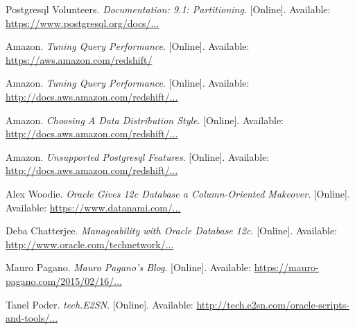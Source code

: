 \documentclass[draftclsnofoot, onecolumn, compsoc, 10pt]{IEEEtran}
\begin{document}
\begin{thebibliography}{9}
Postgresql Volunteers.
\textit{Documentation: 9.1: Partitioning}.
[Online].
Available: \href{https://www.postgresql.org/docs/9.1/static/ddl-partitioning.html}{https://www.postgresql.org/docs/...}

Amazon.
\textit{Tuning Query Performance}.
[Online].
Available: \href{https://aws.amazon.com/redshift/}{https://aws.amazon.com/redshift/}

Amazon.
\textit{Tuning Query Performance}.
[Online].
Available: \href{http://docs.aws.amazon.com/redshift/latest/dg/c-optimizing-query-performance.html}{http://docs.aws.amazon.com/redshift/...}

Amazon.
\textit{Choosing A Data Distribution Style}.
[Online].
Available: \href{http://docs.aws.amazon.com/redshift/latest/dg/t_Distributing_data.html}{http://docs.aws.amazon.com/redshift/...}

Amazon.
\textit{Unsupported Postgresql Features}.
[Online].
Available: \href{http://docs.aws.amazon.com/redshift/latest/dg/c_unsupported-postgresql-features.html}{http://docs.aws.amazon.com/redshift/...}

Alex Woodie.
\textit{Oracle Gives 12c Database a Column-Oriented Makeover}.
[Online].
Available: \href{https://www.datanami.com/2013/09/23/oracle_gives_12c_database_a_column-oriented_makeover/}{https://www.datanami.com/...}


Deba Chatterjee.
\textit{Manageability with Oracle Database 12c}.
[Online].
Available: \href{http://www.oracle.com/technetwork/database/manageability/database-manageability-wp-12c-1964677.pdf}{http://www.oracle.com/technetwork/...}

Mauro Pagano.
\textit{Mauro Pagano's Blog}.
[Online].
Available: \href{https://mauro-pagano.com/2015/02/16/sqld360-sql-diagnostics-collection-made-faster/}{https://mauro-pagano.com/2015/02/16/...}

Tanel Poder.
\textit{tech.E2SN}.
[Online].
Available: \href{http://tech.e2sn.com/oracle-scripts-and-tools/session-snapper}{http://tech.e2sn.com/oracle-scripts-and-tools/...}

\end{thebibliography}
\end{document}
